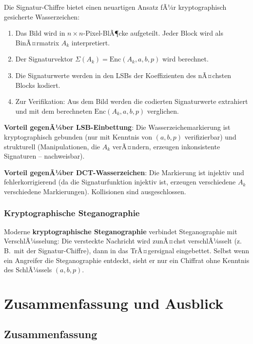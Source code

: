 ﻿\documentclass[a4paper,12pt]{scrreprt}
\theoremstyle{definition}
\begin{document}
Die Signatur-Chiffre bietet einen neuartigen Ansatz fÃ¼r kryptographisch gesicherte Wasserzeichen:

\begin{enumerate}
    \item Das Bild wird in $n\times n$-Pixel-BlÃ¶cke aufgeteilt. Jeder Block wird als BinÃ¤rmatrix $A_k$ interpretiert.
    \item Der Signaturvektor $\Sigma(A_k) = \mathrm{Enc}(A_k, a, b, p)$ wird berechnet.
    \item Die Signaturwerte werden in den LSBs der Koeffizienten des nÃ¤chsten Blocks kodiert.
    \item Zur Verifikation: Aus dem Bild werden die codierten Signaturwerte extrahiert und mit dem berechneten $\mathrm{Enc}(A_k, a, b, p)$ verglichen.
\end{enumerate}

\textbf{Vorteil gegenÃ¼ber LSB-Einbettung}: Die Wasserzeichemarkierung ist kryptographisch gebunden (nur mit Kenntnis von $(a,b,p)$ verifizierbar) und strukturell (Manipulationen, die $A_k$ verÃ¤ndern, erzeugen inkonsistente Signaturen -- nachweisbar).

\textbf{Vorteil gegenÃ¼ber DCT-Wasserzeichen}: Die Markierung ist injektiv und fehlerkorrigierend (da die Signaturfunktion injektiv ist, erzeugen verschiedene $A_k$ verschiedene Markierungen). Kollisionen sind ausgeschlossen.

\subsubsection{Kryptographische Steganographie}

Moderne \textbf{kryptographische Steganographie} \cite{Cox97} verbindet Steganographie mit VerschlÃ¼sselung: Die versteckte Nachricht wird zunÃ¤chst verschlÃ¼sselt (z.\,B.\ mit der Signatur-Chiffre), dann in das TrÃ¤gersignal eingebettet. Selbst wenn ein Angreifer die Steganographie entdeckt, sieht er nur ein Chiffrat ohne Kenntnis des SchlÃ¼ssels $(a,b,p)$.

\section{Zusammenfassung und Ausblick}
\label{chap:ausblick}

\subsection{Zusammenfassung}
\end{document}
